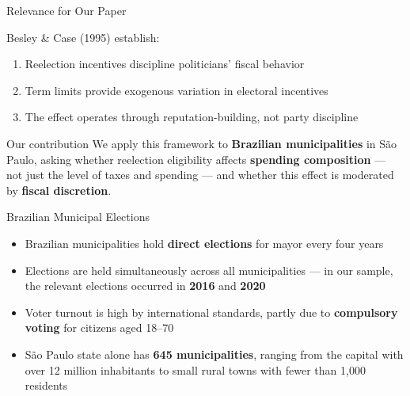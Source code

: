 \documentclass{beamer}
\begin{document}
\begin{frame}{Relevance for Our Paper}
\begin{block}{Besley \& Case (1995) establish:}
\begin{enumerate}
    \item Reelection incentives discipline politicians' fiscal behavior
    \item Term limits provide exogenous variation in electoral incentives
    \item The effect operates through reputation-building, not party discipline
\end{enumerate}
\end{block}
\vspace{0.5em}
\begin{alertblock}{Our contribution}
We apply this framework to \textbf{Brazilian municipalities} in São Paulo, asking whether reelection eligibility affects \textbf{spending composition} --- not just the level of taxes and spending --- and whether this effect is moderated by \textbf{fiscal discretion}.
\end{alertblock}
\end{frame}

\begin{frame}{Brazilian Municipal Elections}
\begin{itemize}
    \item Brazilian municipalities hold \textbf{direct elections} for mayor every four years
    \vspace{0.5em}
    \item Elections are held simultaneously across all municipalities --- in our sample, the relevant elections occurred in \textbf{2016} and \textbf{2020}
    \vspace{0.5em}
    \item Voter turnout is high by international standards, partly due to \textbf{compulsory voting} for citizens aged 18--70
    \vspace{0.5em}
    \item São Paulo state alone has \textbf{645 municipalities}, ranging from the capital with over 12 million inhabitants to small rural towns with fewer than 1,000 residents
\end{itemize}
\end{frame}
\end{document}
